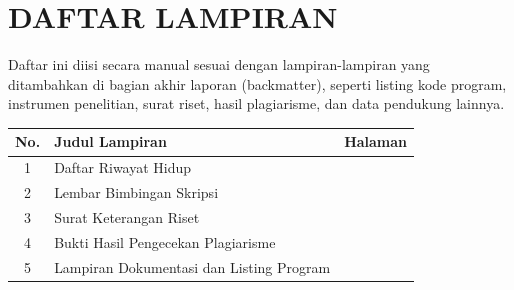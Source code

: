 \clearpage
\chapter*{DAFTAR LAMPIRAN}

Daftar ini diisi secara manual sesuai dengan lampiran-lampiran yang ditambahkan di bagian akhir laporan (backmatter), seperti listing kode program, instrumen penelitian, surat riset, hasil plagiarisme, dan data pendukung lainnya.

\begin{longtable}{clc}
\textbf{No.} & \textbf{Judul Lampiran} & \textbf{Halaman} \\
\hline
1 & Daftar Riwayat Hidup & \pageref{lamp:riwayat-hidup} \\
2 & Lembar Bimbingan Skripsi & \pageref{lamp:lembar-bimbingan} \\
3 & Surat Keterangan Riset & \pageref{lamp:keterangan-riset} \\
4 & Bukti Hasil Pengecekan Plagiarisme & \pageref{lamp:bukti-plagiarisme} \\
5 & Lampiran Dokumentasi dan Listing Program & \pageref{lamp:lampiran-utama} \\
\hline
\end{longtable}
